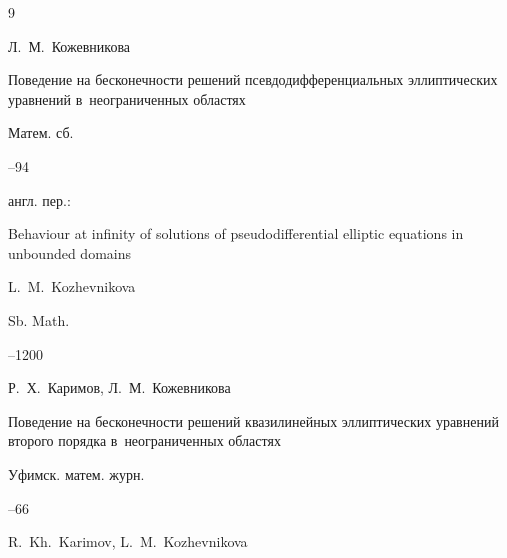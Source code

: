 \begin{thebibliography}{9}




\by Л.~М.~Кожевникова

\paper Поведение на бесконечности решений псевдодифференциальных эллиптических уравнений в~неограниченных областях

\jour Матем. сб.




--94




\transl англ. пер.:~

\paper Behaviour at infinity of solutions of pseudodifferential elliptic equations in unbounded domains

\by L.~M.~Kozhevnikova

\jour Sb. Math.




--1200






\by Р.~Х.~Каримов, Л.~М.~Кожевникова

\paper Поведение на бесконечности решений квазилинейных эллиптических уравнений второго порядка в~неограниченных областях

\jour Уфимск. матем. журн.




--66


\misctransl

\by R.~Kh.~Karimov, L.~M.~Kozhevnikova


\end{thebibliography}
